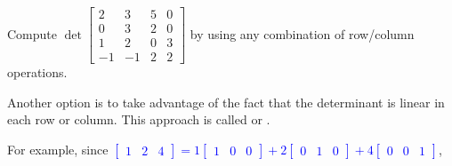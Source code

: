 \begin{activity}{10}
  Compute 
  \(
    \det\begin{bmatrix} 
      2 & 3 & 5 & 0 \\ 
      0 & 3 & 2 & 0 \\ 
      1 & 2 & 0 & 3 \\ 
      -1 & -1 & 2 & 2 
    \end{bmatrix}
  \) by using any combination of row/column operations.
\end{activity}

\begin{observation}
Another option is to take advantage of the fact that the determinant is linear 
in each row or column.  This approach is called
 or . 

For example, since 
\textcolor{blue}{\(
  \begin{bmatrix} 1 & 2 & 4 \end{bmatrix} 
= 
  1\begin{bmatrix} 1 & 0 & 0 \end{bmatrix}
+
  2\begin{bmatrix} 0 & 1 &  0 \end{bmatrix}
+
  4\begin{bmatrix} 0  & 0 & 1 \end{bmatrix}
\)},


\end{observation}
